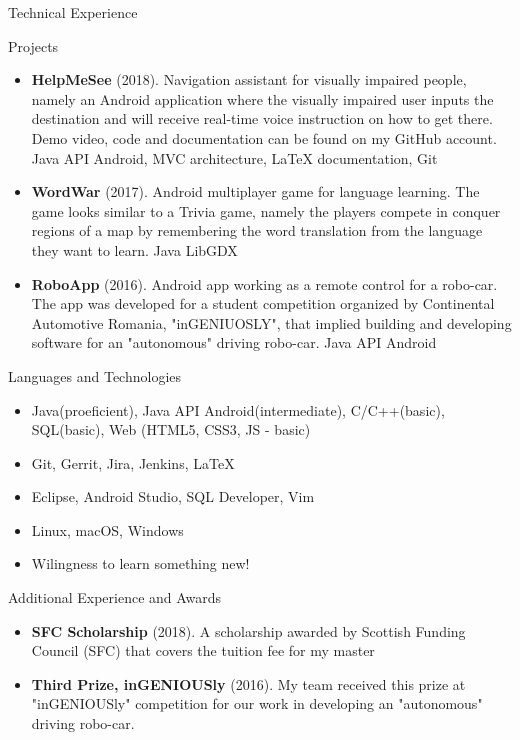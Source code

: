 \documentclass[]{mcdowellcv}
\begin{document}
	\begin{cvsection}{Technical Experience}
		\begin{cvsubsection}{Projects}{}{}
			\begin{itemize}
				\item \textbf{HelpMeSee} (2018). Navigation assistant for visually impaired people, namely an Android application where the visually impaired user inputs the destination and will receive real-time voice instruction on how to get there. Demo video, code and documentation can be found on my GitHub account. Java API Android, MVC architecture, LaTeX documentation, Git 
				\item \textbf{WordWar} (2017). Android multiplayer game for language learning. The game looks similar to a Trivia game, namely the players compete in conquer regions of a map by remembering the word translation from the language they want to learn. Java LibGDX 
				\item \textbf{RoboApp} (2016). Android app working as a remote control for a robo-car. The app was developed for a student competition organized by Continental Automotive Romania, "inGENIUOSLY", that implied building and developing software for an "autonomous" driving robo-car. Java API Android
			\end{itemize}
		\end{cvsubsection}
	\end{cvsection}
	
		
	\begin{cvsection}{Languages and Technologies}
		\begin{cvsubsection}{}{}{}	
			\begin{itemize}
				\item Java(proeficient), Java API Android(intermediate), C/C++(basic), SQL(basic), Web (HTML5, CSS3, JS - basic) 
				\item Git, Gerrit, Jira, Jenkins, LaTeX
				\item Eclipse, Android Studio, SQL Developer, Vim
				\item Linux, macOS, Windows
				\item Wilingness to learn something new!
			\end{itemize}
		\end{cvsubsection}
	\end{cvsection}

	\pagebreak

	\begin{cvsection}{Additional Experience and Awards}
		\begin{cvsubsection}{}{}{}	
			\begin{itemize}
				\item \textbf{SFC Scholarship} (2018). A scholarship awarded by Scottish Funding Council (SFC) that covers the tuition fee for my master
				\item \textbf{Third Prize, inGENIOUSly} (2016). My team received this prize at "inGENIOUSly" competition for our work in developing an "autonomous" driving robo-car. 
			\end{itemize}
		\end{cvsubsection}
	\end{cvsection}
\end{document}
